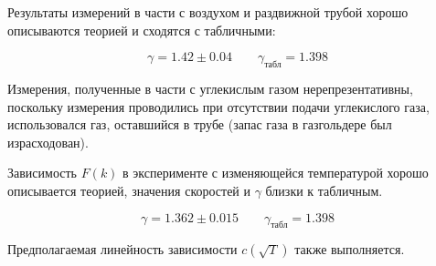 \documentclass[12pt,a4paper]{article}
\begin{document}
		Результаты измерений в части с воздухом и раздвижной трубой хорошо описываются теорией и сходятся с табличными:
		
		$$\gamma = 1.42 \pm 0.04 \qquad \gamma_{\text{табл}} = 1.398$$
		
		Измерения, полученные в части с углекислым газом нерепрезентативны, поскольку измерения проводились при отсутствии подачи углекислого газа, использовался газ, оставшийся в трубе (запас газа в газгольдере был израсходован).
	
		Зависимость $F(k)$ в эксперименте с изменяющейся температурой хорошо описывается теорией, значения скоростей и $\gamma$ близки к табличным. 
		
		$$\gamma = 1.362 \pm 0.015 \qquad \gamma_{\text{табл}} = 1.398$$
		
		Предполагаемая линейность зависимости $c(\sqrt{T})$ также выполняется.
		
\end{document}
